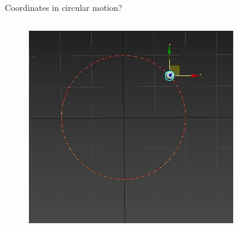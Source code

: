\documentclass[]{beamer}
\begin{document}
\begin{frame}

   Coordinates in circular motion?
   

       
  

          \begin{columns}[c]
            \column{2.3in}  %
 
          

            \column{2.5in}
            
      
            \begin{figure}[h!]  
                \includegraphics[width=0.8\textwidth]{images/30.jpg}
            
              \end{figure}
              
              
              
               
         
            \end{columns}



     
       \end{frame}
\end{document}
